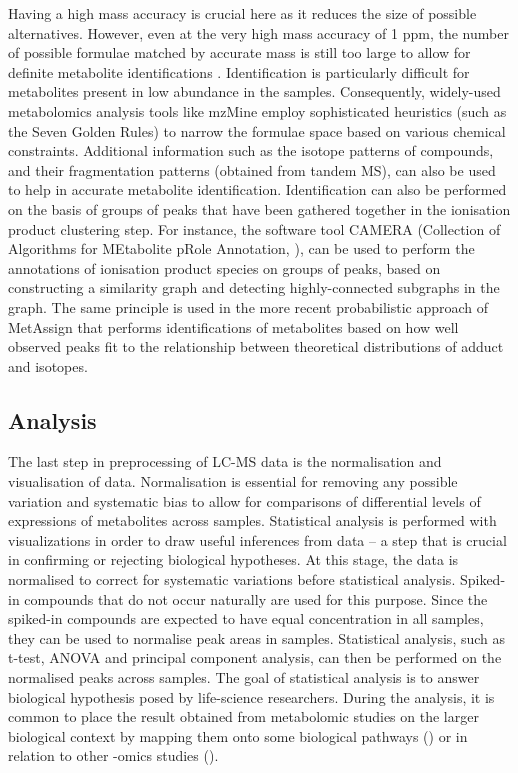 Having a high mass accuracy is crucial here as it reduces the size of possible alternatives. However, even at the very high mass accuracy of 1 ppm, the number of possible formulae matched by accurate mass is still too large to allow for definite metabolite identifications \cite{Kind2006}. Identification is particularly difficult for metabolites present in low abundance in the samples. Consequently, widely-used metabolomics analysis tools like mzMine \cite{Pluskal2010} employ sophisticated heuristics (such as the Seven Golden Rules) to narrow the formulae space based on various chemical constraints. Additional information such as the isotope patterns of compounds, and their fragmentation patterns (obtained from tandem MS), can also be used to help in accurate metabolite identification. Identification can also be performed on the basis of groups of peaks that have been gathered together in the ionisation product clustering step. For instance, the software tool CAMERA (Collection of Algorithms for MEtabolite pRole Annotation, \cite{Kuhl2012}), can be used to perform the annotations of ionisation product species on groups of peaks, based on constructing a similarity graph and detecting highly-connected subgraphs in the graph. The same principle is used in the more recent probabilistic approach of MetAssign \cite{Daly2014} that performs identifications of metabolites based on how well observed peaks fit to the relationship between theoretical distributions of adduct and isotopes. 

\subsection{Analysis}

The last step in preprocessing of LC-MS data is the normalisation and visualisation of data. Normalisation is essential for removing any possible variation and systematic bias to allow for comparisons of differential levels of expressions of metabolites across samples. Statistical analysis is performed with visualizations in order to draw useful inferences from data -- a step that is crucial in confirming or rejecting biological hypotheses. At this stage, the data is normalised to correct for systematic variations before statistical analysis. Spiked-in compounds that do not occur naturally are used for this purpose. Since the spiked-in compounds are expected to have equal concentration in all samples, they can be used to normalise peak areas in samples. Statistical analysis, such as t-test, ANOVA and principal component analysis, can then be performed on the normalised peaks across samples. The goal of statistical analysis is to answer biological hypothesis posed by life-science researchers. During the analysis, it is common to place the result obtained from metabolomic studies on the larger biological context by mapping them onto some biological pathways (\cite{Xia2010,Krumsiek2011a}) or in relation to other -omics studies (\cite{Krumsiek2012,Gieger2008}).

